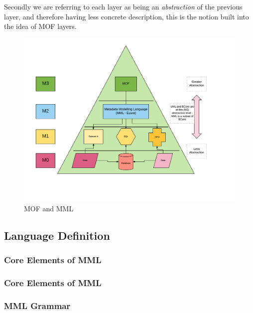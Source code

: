 \documentclass{llncs}
\begin{document}
Secondly we are referring to each layer as being an \emph{abstraction} of the previous layer, and therefore having less concrete description, this is the notion built into the idea of MOF layers. 

\begin{figure}
	\centering
	\includegraphics[scale=0.45]{figures/MMLMOFModel}
	\caption{MOF and MML}
	\label{fig:mofmml}
\end{figure}



\subsection{Language Definition}

\subsubsection{Core Elements of MML}

\subsubsection{Core Elements of MML}

\subsubsection{MML Grammar}
\end{document}
